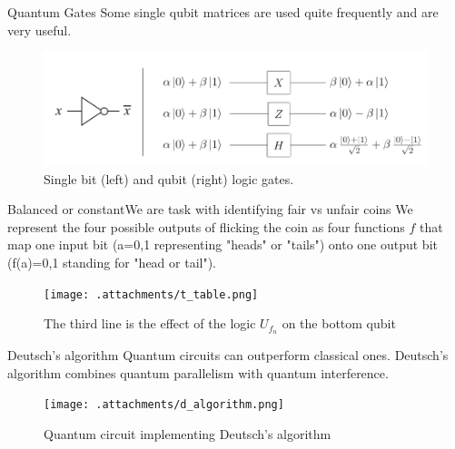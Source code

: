 \documentclass{beamer}
\begin{document}
\begin{frame}{Quantum Gates}
	\justifying 
	Some single qubit matrices are used quite frequently and are very useful.
	\center
	\begin{figure}
	\includegraphics[keepaspectratio=true,width=.8\paperwidth]{.attachments/single_qubit.png}
	\caption{Single bit (left) and qubit (right) logic gates.}
\end{figure}
\end{frame}

\begin{frame}{Balanced or constant}{We are task with identifying fair vs unfair coins}
	\justifying 
	We represent the four possible outputs of flicking the coin as four functions $f$ that map one input bit (a=0,1 representing "heads" or "tails") onto one output bit (f(a)=0,1 standing for "head or tail").
	\newline
	\newline
	\begin{figure}
		\texttt{[image: .attachments/t\_table.png]}
		\caption{The third line is the effect of the logic $U_{f_n}$ on the bottom qubit}
	\end{figure}

\end{frame}

\begin{frame}{Deutsch's algorithm}
	\justifying 
	Quantum circuits can outperform classical ones. Deutsch's algorithm combines quantum parallelism  with quantum interference.
	\center
	\begin{figure}
	\texttt{[image: .attachments/d\_algorithm.png]}
	\caption{Quantum circuit implementing Deutsch's algorithm}
\end{figure}
\end{frame}
\end{document}
